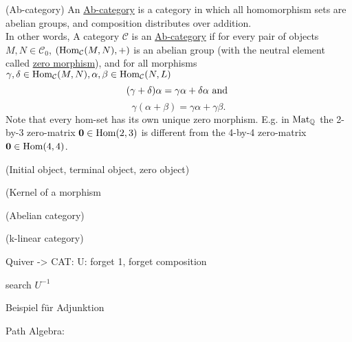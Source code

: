 \begin{definition}{(Ab-category)}
An \ul{Ab-category} is a category in which all homomorphism sets are abelian groups, and composition distributes over addition.\\
In other words,
A category $\mathcal{C}$ is an \ul{Ab-category} if for every pair of objects $M,N \in \mathcal{C}_{0}$, $( \textup{Hom}_{\mathcal{C}}(M,N), + )$ is
an abelian group (with the neutral element called \ul{zero morphism}), and for all morphisms $\gamma, \delta \in \textup{Hom}_{\mathcal{C}}(M,N),
\alpha, \beta \in \textup{Hom}_{\mathcal{C}}(N,L)$
\[
(\gamma + \delta)\alpha = \gamma\alpha + \delta\alpha \textup{ and }\]\[
\gamma(\alpha+\beta) = \gamma\alpha + \gamma\beta.
\]
Note that every hom-set has its own unique zero morphism. E.g. in $\textup{Mat}_{\mathbb{Q}}$ the 2-by-3 zero-matrix $\mathbf{0} \in \textup{Hom}(2,3)$ is different from
the 4-by-4 zero-matrix $\mathbf{0} \in \textup{Hom}(4,4)$.
\end{definition}

\begin{definition}{(Initial object, terminal object, zero object)}

\end{definition}

\begin{example}{}

\end{example}

\begin{definition}{(Kernel of a morphism}

\end{definition}

\begin{definition}{(Abelian category)}

\end{definition}
\begin{definition}{(k-linear category)}

\end{definition}


Quiver -> CAT: U: forget 1, forget composition

search $U^{-1}$

Beispiel für Adjunktion


Path Algebra: